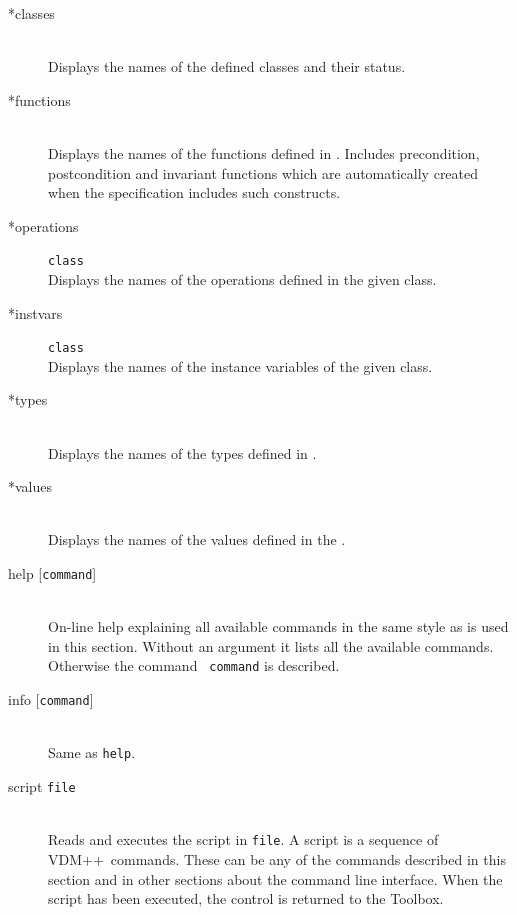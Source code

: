 \documentclass[\pformat,12pt]{article}
\newcommand{\vdmslpp}{VDM++}
\newcommand{\Toolbox}{Toolbox}
\begin{document}
\begin{description}

\item[*classes] \mbox{} \\
  Displays the names of the defined classes and their status.


\item[*functions]  \mbox{}\\ 
  Displays the names of the functions defined in
  .
  Includes precondition, postcondition and invariant functions which are
  automatically created when the specification includes such constructs.

\item[*operations] {\tt class}\mbox{}\\
  Displays the names of  the operations defined in the given class.


\item[*instvars] {\tt class}\mbox{}\\
  Displays the names of the instance variables of the given class.
  

\item[*types] \mbox{}\\ 
  Displays the names of the types defined in
  .

\item[*values] \mbox{}\\ 
  Displays the names of the values defined in the 
  .

\item[help \mbox{[{\tt command}]}] \mbox{}\\
  On-line help explaining all available commands in
  the same style as is used in this section. Without an argument it
  lists all the available commands. Otherwise the command {\tt
    command} is described.

\item[info \mbox{[{\tt command}]}] \mbox{}\\
  Same as {\tt help}.

\item[script {\tt file}] \mbox{}\\
  Reads and executes the script in {\tt file}.  A script is a
  sequence of \vdmslpp\ commands.  These can be any of the commands
  described in this section and in other sections about the
  command line interface.  When the script has been executed, the
  control is returned to the \Toolbox.


\end{description}
\end{document}
